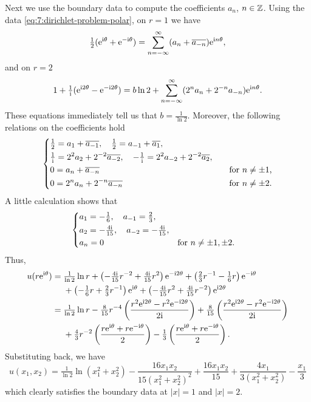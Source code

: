 \begin{solution*}
  Next we use the boundary data to compute the coefficients \(a_n\),
  \(n\in\mathbb{Z}\). Using the data \eqref{eq:7:dirichlet-problem-polar}, on
  \(r=1\) we have
  \[
    \tfrac{1}{2}(\rme^{\rmi\theta}+\rme^{-\rmi\theta})%
    =\sum_{n=-\infty}^\infty (a_n+\overline{a_{-n}})\rme^{\rmi n\theta},
  \]
  and on \(r=2\)
  \[
    1+\tfrac{1}{\mathrm{i}}(\mathrm{e}^{\mathrm{i} 2\theta}-\mathrm{e}^{-\mathrm{i} 2\theta}) = b\ln
    2+\sum_{n=-\infty}^\infty (2^na_n+2^{-n}a_{-n})\mathrm{e}^{\mathrm{i} n\theta}.
  \]
  These equations immediately tell us that \(b=\frac{1}{\ln 2}\). Moreover,
  the following relations on the coefficients hold
  \[
    \left\{
    \begin{aligned}
      &\tfrac{1}{2}=a_1+\overline{a_{-1}},\quad
      \tfrac{1}{2}=a_{-1}+\overline{a_1},\\
      &\tfrac{1}{\mathrm{i}}=2^2a_2+2^{-2}\overline{a_{-2}},\quad
      -\tfrac{1}{\mathrm{i}}=2^2a_{-2}+2^{-2}\overline{a_{2}},\\
      &0=a_n+\overline{a_{-n}}&&&\text{for \(n\neq\pm 1\),}\\
      &0=2^{n}a_n+2^{-n}\overline{a_{-n}}&&&\text{for \(n\neq\pm 2\).}
    \end{aligned}
    \right.
  \]
  A little calculation shows that
  \[
    \left\{
      \begin{aligned}
        &a_1=-\tfrac{1}{6},\quad a_{-1}=\tfrac{2}{3},\\
        &a_2=-\tfrac{4\mathrm{i}}{15},\quad a_{-2}=-\tfrac{4\mathrm{i}}{15},\\
        &a_n=0&&\text{for \(n\neq \pm 1,\pm 2\).}
      \end{aligned}
    \right.
  \]
  Thus,
  \[
    \begin{aligned}
      u(r\rme^{\rmi\theta})
      &=\tfrac{1}{\ln 2}\ln r
      +\left(-\tfrac{4\rmi}{15}r^{-2}+\tfrac{4\rmi}{15}r^2\right)\rme^{-\rmi
        2\theta} +\left(\tfrac{2}{3}r^{-1}-\tfrac{1}{6}r\right)\rme^{-\rmi\theta}\\
      &\phantom{{}={}}
      +\left(-\tfrac{1}{6}r+\tfrac{2}{3}r^{-1}\right)\rme^{\rmi\theta}
      +\left(-\tfrac{4\rmi}{15}r^2+\tfrac{4\rmi}{15}r^{-2}\right)\rme^{\rmi
        2\theta}\\
      &=\tfrac{1}{\ln 2}\ln r-\tfrac{8}{15}r^{-4}
      \left(\frac{r^2\rme^{\rmi 2\theta}-r^2\rme^{-\rmi 2\theta}}{2\rmi}\right)
      +\tfrac{8}{15}
      \left(\frac{r^2\rme^{\rmi 2\theta}-r^2\rme^{-\rmi
            2\theta}}{2\rmi}\right)\\
      &\phantom{{}={}}
      +\tfrac{4}{3}r^{-2}
      \left(\frac{r\rme^{\rmi\theta}+r\rme^{-\rmi\theta}}{2}\right)
      -\tfrac{1}{3}
      \left(\frac{r\rme^{\rmi\theta}+r\rme^{-\rmi\theta}}{2}\right).
    \end{aligned}
  \]
  Substituting back, we have
  \[
    u(x_1,x_2)=\tfrac{1}{\ln 2}\ln(x_1^2+x_2^2)
    -\frac{16x_1x_2}{15{(x_1^2+x_2^2)}^2}+\frac{16x_1x_2}{15}
    +\frac{4x_1}{3(x_1^2+x_2^2)}-\frac{x_1}{3}
  \]
  which clearly satisfies the boundary data at \(|x|=1\) and \(|x|=2\).
\end{solution*}

